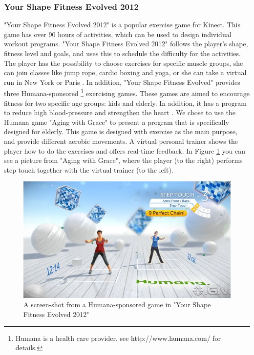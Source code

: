 \subsubsection{Your Shape Fitness Evolved 2012}
"Your Shape Fitness Evolved 2012" is a popular exercise game for Kinect. This game has over 90 hours of activities, which can be used to design individual workout programs. "Your Shape Fitness Evolved 2012" follows the player's shape, fitness level and goals, and uses this to schedule the difficulty for the activities. The player has the possibility to choose exercises for specific muscle groups, she can join classes like jump rope, cardio boxing and yoga, or she can take a virtual run in New York or Paris \cite{yourshape}. In addition, "Your Shape Fitness Evolved" provides three Humana-sponsored \footnote{Humana is a health care provider, see http://www.humana.com/ for details.} exercising games. These games are aimed to encourage fitness for two specific age groups: kids and elderly. In addition, it has a program to reduce high blood-pressure and strengthen the heart \cite{ptspill}. We chose to use the Humana game "Aging with Grace" to present a program that is specifically designed for elderly. This game is designed with exercise as the main purpose, and provide different aerobic movements. A virtual personal trainer shows the player how to do the exercises and offers real-time feedback. In Figure \ref{fig:ptspill} you can see a picture from "Aging with Grace", where the player (to the right) performs step touch together with the virtual trainer (to the left). 

\begin{figure} [H]
\centering
\includegraphics[scale=0.5]{ptspill}
\caption[Your Shape Fitness Evolved 2012]{A screen-shot from a Humana-sponsored game in "Your Shape Fitness Evolved 2012" \cite{ptspill}}
\label{fig:ptspill}
\end{figure}

